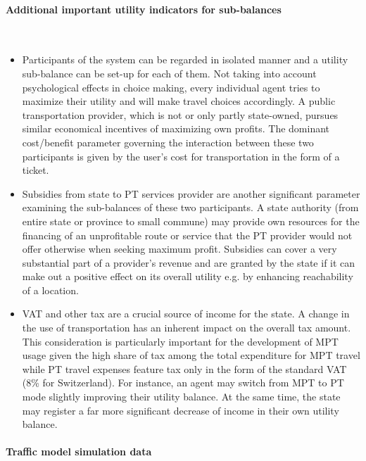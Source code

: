 \paragraph{Additional important utility indicators for sub-balances}\mbox{}\\
\begin{itemize}
	\item Participants of the system can be regarded in isolated manner and a utility sub-balance can be set-up for each of them. Not taking into account psychological effects in choice making, every individual agent tries to maximize their utility and will make travel choices accordingly. A public transportation provider, which is not or only partly state-owned, pursues similar economical incentives of maximizing own profits. The dominant cost/benefit parameter governing the interaction between these two participants is given by the user's cost for transportation in the form of a ticket.
	\item Subsidies from state to PT services provider are another significant parameter examining the sub-balances of these two participants. A state authority (from entire state or province to small commune) may provide own resources for the financing of an unprofitable route or service that the PT provider would not offer otherwise when seeking maximum profit. Subsidies can cover a very substantial part of a provider's revenue and are granted by the state if it can make out a positive effect on its overall utility e.g. by enhancing reachability of a location.
	\item VAT and other tax are a crucial source of income for the state. A change in the use of transportation has an inherent impact on the overall tax amount. This consideration is particularly important for the development of MPT usage given the high share of tax among the total expenditure for MPT travel while PT travel expenses feature tax only in the form of the standard VAT (8\% for Switzerland). For instance, an agent may switch from MPT to PT mode slightly improving their utility balance. At the same time, the state may register a far more significant decrease of income in their own utility balance.
\end{itemize}



\paragraph{Traffic model simulation data}\mbox{}\\
 
